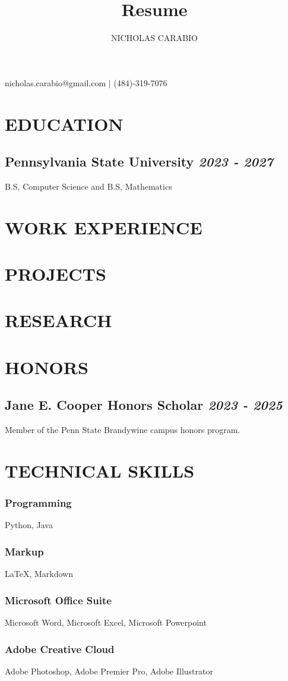 \documentclass{article}
\makeatletter
\renewcommand{\maketitle}{
\begin{center}
{\huge\bfseries\theauthor}

\vspace{.25em}

nicholas.carabio@gmail.com $|$ (484)-319-7076
\end{center}
}
\makeatother
\begin{document}
\title{Resume}
\author{NICHOLAS CARABIO}

\maketitle

\section{EDUCATION}

\subsection{\textbf{Pennsylvania State University} \hfill \textit{2023 - 2027}}
B.S, Computer Science and B.S, Mathematics 

\section{WORK EXPERIENCE}

\section{PROJECTS}

\section{RESEARCH}

\section{HONORS}
\subsection{\textbf{Jane E. Cooper Honors Scholar} \hfill \textit{2023 - 2025}}
Member of the Penn State Brandywine campus honors program.

\section{TECHNICAL SKILLS}  

\subsubsection{Programming}
Python, Java

\subsubsection{Markup}
\LaTeX , Markdown

\subsubsection{Microsoft Office Suite}
Microsoft Word, Microsoft Excel, Microsoft Powerpoint

\subsubsection{Adobe Creative Cloud}
Adobe Photoshop, Adobe Premier Pro, Adobe Illustrator
\end{document}
